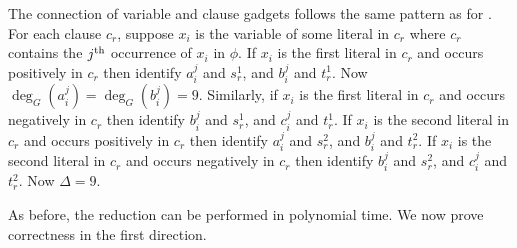 The connection of variable and clause gadgets follows the same pattern as for \edkfour. For each clause $c_r$, suppose $x_i$ is the variable of some literal in $c_r$ where $c_r$ contains the $j\textsuperscript{th}$ occurrence of $x_i$ in $\phi$. If $x_i$ is the first literal in $c_r$ and occurs positively in $c_r$ then identify $a_i^j$ and $s_r^1$, and $b_i^j$ and $t_r^1$. Now $\deg_{G}(a_i^j) = \deg_{G}(b_i^j) = 9$. Similarly, if $x_i$ is the first literal in $c_r$ and occurs negatively in $c_r$ then identify $b_i^j$ and $s_r^1$, and $c_i^j$ and $t_r^1$. If $x_i$ is the second literal in $c_r$ and occurs positively in $c_r$ then identify $a_i^j$ and $s_r^2$, and $b_i^j$ and $t_r^2$. If $x_i$ is the second literal in $c_r$ and occurs negatively in $c_r$ then identify $b_i^j$ and $s_r^2$, and $c_i^j$ and $t_r^2$. Now $\Delta = 9$.


As before, the reduction can be performed in polynomial time.  We now prove correctness in the first direction.


